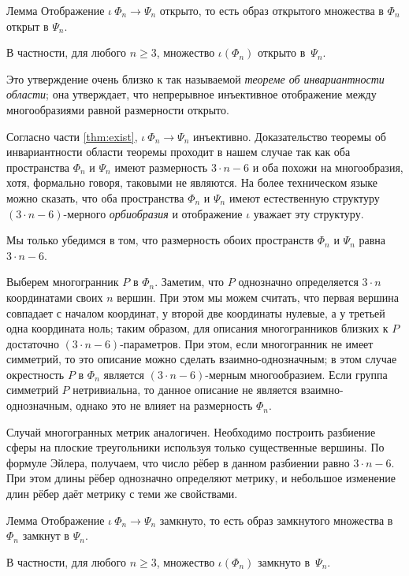 \documentclass[oneside,a4paper]{article}
\begin{document}
\begin{thm}{Лемма}
Отображение $\iota\:\Phi_n\to\Psi_n$ открыто, 
то есть образ открытого множества в $\Phi_n$ открыт в $\Psi_n$.

В частности, для любого $n\ge 3$, множество $\iota(\Phi_n)$ открыто в~$\Psi_n$.
\end{thm}

Это утверждение очень близко к так называемой \emph{теореме об инвариантности области};
она утверждает, что непрерывное инъективное отображение между многообразиями равной размерности открыто.

Согласно части \ref{thm:exist}, $\iota\:\Phi_n\to\Psi_n$ инъективно.
Доказательство теоремы об инвариантности области теоремы проходит в нашем случае так как оба пространства $\Phi_n$ и $\Psi_n$ имеют размерность $3\cdot n-6$ и оба похожи на многообразия, хотя, формально говоря, таковыми не являются.
На более техническом языке можно сказать, что оба пространства $\Phi_n$ и $\Psi_n$ имеют естественную структуру $(3\cdot n-6)$-мерного \emph{орбиобразия} и отображение $\iota$ уважает эту структуру.

Мы только убедимся в том, что размерность обоих пространств $\Phi_n$ и $\Psi_n$ равна $3\cdot n-6$.

Выберем многогранник $P$ в $\Phi_n$.
Заметим, что $P$ однозначно определяется $3\cdot n$ координатами своих $n$ вершин.
При этом мы можем считать, что первая вершина совпадает с началом координат, у второй две координаты нулевые, а у третьей одна координата ноль; таким образом, для описания многогранников близких к $P$ достаточно $(3\cdot n-6)$-параметров.
При этом, если многогранник не имеет симметрий, то это описание можно сделать взаимно-однозначным;
в этом случае окрестность $P$ в $\Phi_n$ является $(3\cdot n-6)$-мерным многообразием.
Если группа симметрий $P$ нетривиальна,
то данное описание не является взаимно-однозначным, однако это не влияет на размерность $\Phi_n$.

Случай многогранных метрик аналогичен.
Необходимо построить разбиение сферы на плоские треугольники используя только существенные вершины.
По формуле Эйлера, получаем, что число рёбер в данном разбиении равно $3\cdot n-6$.
При этом длины рёбер однозначно определяют метрику, и небольшое изменение длин рёбер даёт метрику с теми же свойствами.


\begin{thm}{Лемма}
Отображение $\iota\:\Phi_n\to\Psi_n$ замкнуто, 
то есть образ замкнутого множества в $\Phi_n$ замкнут в $\Psi_n$.

В частности, для любого $n\ge 3$, множество $\iota(\Phi_n)$ замкнуто в~$\Psi_n$.
\end{thm}
\end{document}
